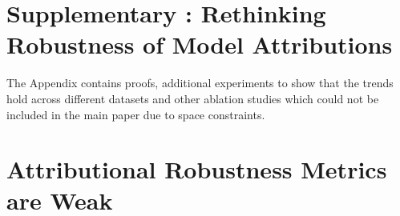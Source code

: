 \documentclass[letterpaper]{article} %
\begin{document}




\clearpage

\appendix
\section{Supplementary : Rethinking Robustness of Model Attributions}

The Appendix contains proofs, additional experiments to show that the trends hold across different datasets and other ablation studies which could not be included in the main paper due to space constraints. %

\section{Attributional Robustness Metrics are Weak} \label{app:random-ext-fragile}
\end{document}
